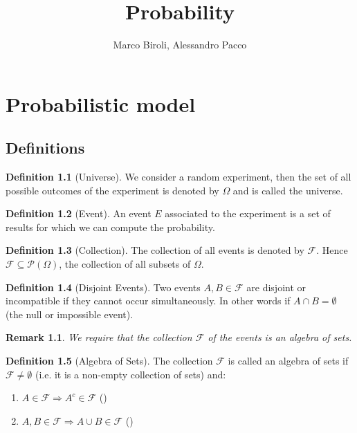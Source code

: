 \documentclass[10pt,a4paper]{book}
\author{Marco Biroli, Alessandro Pacco}
\title{Probability}
\newtheorem*{remark}{Remark}
\theoremstyle{definition}
\newtheorem{definition}{Definition}[section]
\begin{document}
\maketitle
\tableofcontents
\chapter{Probabilistic model}
\section{Definitions}

\begin{definition}[Universe]
We consider a random experiment, then the set of all possible outcomes of the experiment is denoted by $\Omega$ and is called the universe.
\end{definition}

\begin{definition}[Event]
An event $E$ associated to the experiment is a set of results for which we can compute the probability.
\end{definition}

\begin{definition}[Collection]
The collection of all events is denoted by $\mathcal{F}$. Hence $\mathcal{F} \subseteq \mathcal{P}(\Omega)$, the collection of all subsets of $\Omega$.
\end{definition}

\begin{definition}[Disjoint Events]
Two events $A, B \in \mathcal{F}$ are disjoint or incompatible if they cannot occur simultaneously. In other words if $A \cap B = \emptyset$ (the null or impossible event).
\end{definition}

\begin{remark}
We require that the collection $\mathcal{F}$ of the events is an algebra of sets.
\end{remark}

\begin{definition}[Algebra of Sets]
The collection $\mathcal{F}$ is called an algebra of sets if $\mathcal{F} \neq \emptyset$ (i.e. it is a non-empty collection of sets) and:
\begin{enumerate}
\item $A \in \mathcal{F} \Rightarrow A^c \in \mathcal{F}$ ()
\item $A, B \in \mathcal{F} \Rightarrow A \cup B \in \mathcal{F}$ ()
\end{enumerate}
\end{definition}
\end{document}
